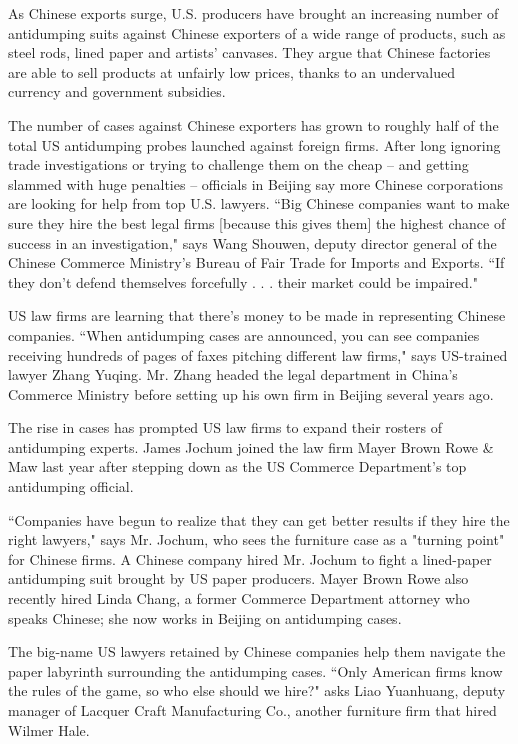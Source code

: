 \documentclass[letterpaper,12pt]{article}
\begin{document}
As Chinese exports surge, U.S. producers have brought an increasing number of antidumping suits against Chinese exporters of a wide range of products, such as steel rods, lined paper and artists' canvases. They argue that Chinese factories are able to sell products at unfairly low prices, thanks to an undervalued currency and government subsidies.

The number of cases against Chinese exporters has grown to roughly half of the total US antidumping probes launched against foreign firms. After long ignoring trade investigations or trying to challenge them on the cheap -- and getting slammed with huge penalties -- officials in Beijing say more Chinese corporations are looking for help from top U.S. lawyers. ``Big Chinese companies want to make sure they hire the best legal firms [because this gives them] the highest chance of success in an investigation," says Wang Shouwen, deputy director general of the Chinese Commerce Ministry's Bureau of Fair Trade for Imports and Exports. ``If they don't defend themselves forcefully . . . their market could be impaired."

US law firms are learning that there's money to be made in representing Chinese companies. ``When antidumping cases are announced, you can see companies receiving hundreds of pages of faxes pitching different law firms," says US-trained lawyer Zhang Yuqing. Mr. Zhang headed the legal department in China's Commerce Ministry before setting up his own firm in Beijing several years ago.

The rise in cases has prompted US law firms to expand their rosters of antidumping experts. James Jochum joined the law firm Mayer Brown Rowe \& Maw last year after stepping down as the US Commerce Department's top antidumping official.

``Companies have begun to realize that they can get better results if they hire the right lawyers," says Mr. Jochum, who sees the furniture case as a "turning point" for Chinese firms. A Chinese company hired Mr. Jochum to fight a lined-paper antidumping suit brought by US paper producers. Mayer Brown Rowe also recently hired Linda Chang, a former Commerce Department attorney who speaks Chinese; she now works in Beijing on antidumping cases.

The big-name US lawyers retained by Chinese companies help them navigate the paper labyrinth surrounding the antidumping cases. ``Only American firms know the rules of the game, so who else should we hire?" asks Liao Yuanhuang, deputy manager of Lacquer Craft Manufacturing Co., another furniture firm that hired Wilmer Hale.
\end{document}
